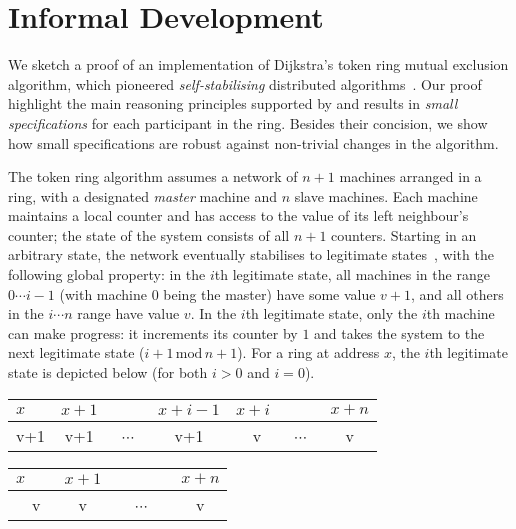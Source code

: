 \section{Informal Development}
\label{sec:intuition}

We sketch a proof of an implementation of Dijkstra's token ring mutual
exclusion algorithm, which pioneered \emph{self-stabilising}
distributed algorithms~\cite{dijkstra74}. Our proof highlight the main
reasoning principles supported by \colosl and results in \emph{small
  specifications} for each participant in the ring. Besides their
concision, we show how small specifications are robust against
non-trivial changes in the algorithm.

The token ring algorithm %
assumes a network of $n{+}1$ machines arranged in a ring, with a
designated \emph{master} machine and $n$ slave machines. Each machine maintains a local counter and has
access to the value of its left neighbour's counter; the state of the
system consists of all $n{+}1$ counters. Starting in an arbitrary state,
the network eventually stabilises to legitimate
states~\cite{dijkstra-proof}, with the following global property: 
in the $i$th legitimate state, all machines in the range $0\cdots i{-}1$ (with machine $0$ being the master) have some value $v{+}1$, and all others in the $i \cdots n$ range have value $v$.  In the $i$th legitimate state, only the $i$th machine can make progress: it increments its counter by $1$ and takes the system to the next legitimate state ($i{+}1 \,\text{mod}\, n{+}1$). For a ring at address $x$, the $i$th legitimate state is depicted below (for both $i>0$ and $i=0$).  \\ \null\hfill
  \begin{tabular}{lllllll}
    $x$&$x{+}1$&&$x{+}i{-}1$&$x{+}i$&&$x{+}n$
    \\
    \hline
    \multicolumn{1}{|c|}{v+1} &
    \multicolumn{1}{|c|}{v+1} &
    \multicolumn{1}{|c|}{~$\cdots$~} &
    \multicolumn{1}{|c|}{v+1} &
    \multicolumn{1}{|c|}{~~v~\raisebox{1ex}{$\bullet$}} &
    \multicolumn{1}{|c|}{~$\cdots$~} &
    \multicolumn{1}{|c|}{v}\\
    \hline
  \end{tabular}\hfill
  \begin{tabular}{lllllll}
    $x$&$x{+}1$&&&&&$x{+}n$\\
    \hline
    \multicolumn{1}{|c|}{~~v~\raisebox{1ex}{$\bullet$}} &
    \multicolumn{1}{|c|}{v} &
    \multicolumn{4}{|c|}{~$\cdots$~} &
    \multicolumn{1}{|c|}{v}\\
    \hline
  \end{tabular}
  \hfill\null\\


